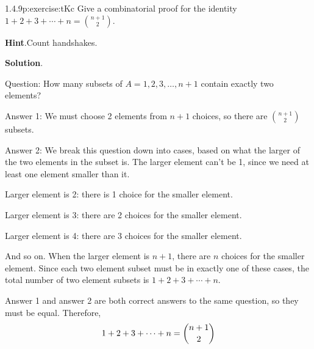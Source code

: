 \documentclass[twoside,11pt,]{book}
\newcommand{\blocktitlefont}{\relax}
\newcommand{\qedhere}{\relax}
\numberwithin{equation}{chapter}
\begin{document}
\begin{divisionsolution}{1.4.9}{}{p:exercise:tKc}%
Give a combinatorial proof for the identity \(1 + 2 + 3 + \cdots + n = {n+1 \choose 2}\).%
\par\smallskip%
\noindent\textbf{\blocktitlefont Hint}.\quad{}Count handshakes.%
\par\smallskip%
\noindent\textbf{\blocktitlefont Solution}.\quad{}\begin{solutionproof}
Question: How many subsets of \(A = {1,2,3, \ldots,
n+1}\) contain exactly two elements?%
\par
Answer 1: We must choose 2 elements from \(n+1\) choices, so there are \({n+1 \choose 2}\) subsets.%
\par
Answer 2: We break this question down into cases, based on what the larger of the two elements in the subset is. The larger element can't be 1, since we need at least one element smaller than it.%
\par
Larger element is 2: there is 1 choice for the smaller element.%
\par
Larger element is 3: there are 2 choices for the smaller element.%
\par
Larger element is 4: there are 3 choices for the smaller element.%
\par
And so on. When the larger element is \(n+1\), there are \(n\) choices for the smaller element. Since each two element subset must be in exactly one of these cases, the total number of two element subsets is \(1 + 2 + 3 + \cdots + n\).%
\par
Answer 1 and answer 2 are both correct answers to the same question, so they must be equal. Therefore,%
\begin{equation*}
1 + 2 + 3 + \cdots + n = {n+1 \choose 2}\qedhere
\end{equation*}
%
\end{solutionproof}
\end{divisionsolution}%
\end{document}

